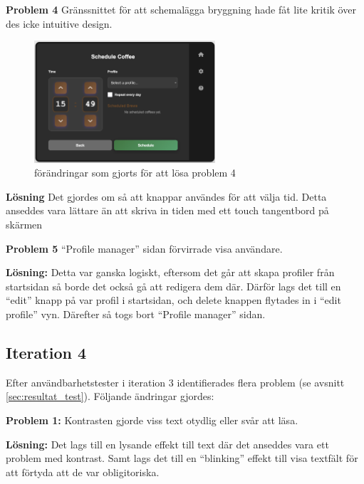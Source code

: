 \textbf{Problem 4} Gränssnittet för att schemalägga bryggning hade fåt lite kritik över des icke intuitive design. 

\begin{figure}[H]
    \centering
    \includegraphics[width=0.6\textwidth]{bilder/3problem4.png}
    \caption{ förändringar som gjorts för att lösa problem 4}
    \label{fig:forbattring3}
\end{figure}
\textbf{Lösning} Det gjordes om så att knappar användes för att välja tid. Detta anseddes vara lättare än att skriva in tiden med ett touch tangentbord på skärmen  

 \textbf{Problem 5} “Profile manager” sidan förvirrade visa användare.  

\textbf{Lösning:} Detta var ganska logiskt, eftersom det går att skapa profiler från startsidan så borde det också gå att redigera dem där. Därför lags det till en “edit” knapp  på var profil i startsidan, och delete knappen flytades in i “edit profile” vyn.  Därefter så togs bort “Profile manager” sidan.  






\subsection{Iteration 4}

Efter användbarhetstester i iteration 3 identifierades flera problem (se avsnitt \ref{sec:resultat_test}). Följande ändringar gjordes:

\textbf{Problem 1:} Kontrasten gjorde viss text otydlig eller svår att läsa.  

  

\textbf{Lösning:} Det lags till en lysande effekt till text där det anseddes vara ett problem med kontrast. Samt lags det till en “blinking” effekt till visa textfält för att förtyda att de var obligitoriska.  

